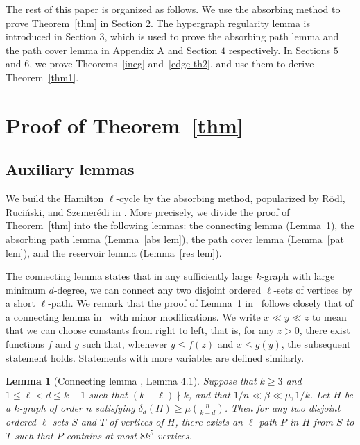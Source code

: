 \documentclass[11pt, reqno]{amsart}    	%
\newtheorem{lemma}[thm]{Lemma}
\theoremstyle{definition}
\numberwithin{equation}{section}
\begin{document}
	The rest of this paper is organized as follows. 
	We use the absorbing method to prove Theorem~\ref{thm} in Section $2$. 
	The hypergraph regularity lemma is introduced in Section $3$, which is used to prove the absorbing path lemma and the path cover lemma in Appendix A and Section $4$ respectively. 
	In Sections $5$ and $6$, we prove Theorems~\ref{ineg} and~\ref{edge th2}, and use them to derive Theorem~\ref{thm1}.
	
	\section{Proof of Theorem~\ref{thm}}
	
	\subsection{Auxiliary lemmas}
	We build the Hamilton $\ell$-cycle by the absorbing method, popularized by R\"odl, Ruci\'nski, and Szemer\'edi in \cite{VOJTECH2006A}. More precisely, we divide the proof of Theorem~\ref{thm} into the following lemmas: the connecting lemma (Lemma~\ref{con lem}), the absorbing path lemma (Lemma~\ref{abs lem}), the path cover lemma (Lemma~\ref{pat lem}), and the reservoir lemma (Lemma~\ref{res lem}).
	
	The connecting lemma states that in any sufficiently large $ k $-graph with large minimum $ d $-degree, we can connect  any two disjoint ordered  $ \ell $-sets of vertices by a short $ \ell $-path.
	We remark that the proof of Lemma~\ref{con lem} in~\cite{Han2021Non} follows closely that of a connecting lemma in~\cite{Daniela2010Hamilton} with minor modifications. We write $x\ll y\ll z$ to mean that we can choose constants from right to left, that is, for any $z>0$, there exist functions $f$ and $g$ such that, whenever $y\leq f(z)$ and $x\leq g(y)$, the subsequent statement holds. Statements with more variables are defined similarly.
	
	\begin{lemma}[Connecting lemma \cite{Han2021Non}, Lemma 4.1]
		\label{con lem}
		Suppose that $k\ge3$ and $1\leq \ell<d \leq k-1$ such that $(k-\ell)\nmid k$, and that $1/n \ll \beta\ll \mu,1/k$.
		Let $H$ be a $k$-graph of order $n$ satisfying $\delta_d(H)\ge \mu \binom{n}{k-d}$. Then for any two disjoint ordered $\ell$-sets $S$ and $T$ of vertices of $H$, there exists an $\ell$-path $P$ in $H$	from $S$ to $T$ such that $P$ contains at most  $8k^{5}$ vertices.	
	\end{lemma}
	
\end{document}
